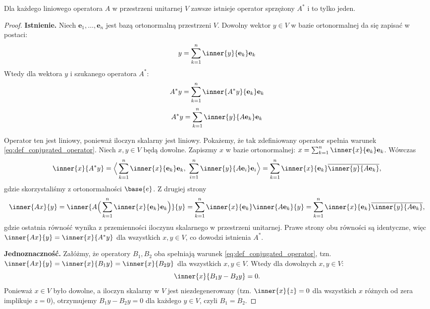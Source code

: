 \begin{theorem}
Dla każdego liniowego operatora $A$ w przestrzeni unitarnej $V$ zawsze istnieje operator sprzężony $A^*$ i to tylko jeden.
\end{theorem}
\begin{proof}
\textbf{Istnienie.} Niech $\mathbf{e}_1, \ldots, \mathbf{e}_n$ jest bazą ortonormalną przestrzeni $V$. Dowolny wektor $y \in V$ w bazie ortonormalnej da się zapisać w postaci:
$$ y = \sum_{k=1}^{n}{\inner{y}{\mathbf{e}_k}\mathbf{e}_k} $$
    Wtedy dla wektora $y$ i szukanego operatora $A^*$:
\begin{equation}
        A^*y = \sum_{k=1}^{n}{\inner{A^*y}{\mathbf{e}_k}\mathbf{e}_k}
\end{equation}
\begin{equation}
        A^*y = \sum_{k=1}^{n}{\inner{y}{A\mathbf{e}_k}\mathbf{e}_k}
\end{equation}

Operator ten jest liniowy, ponieważ iloczyn skalarny jest liniowy.
Pokażemy, że tak zdefiniowany operator spełnia warunek \eqref{eq:def_conjugated_operator}. Niech $x, y \in V$ będą dowolne. Zapiszmy $x$ w bazie ortonormalnej: $x = \sum_{k=1}^n \inner{x}{\mathbf{e}_k}\mathbf{e}_k$. Wówczas
\begin{equation}
    \inner{x}{A^*y} = \Big\langle \sum_{k=1}^n \inner{x}{\mathbf{e}_k}\mathbf{e}_k,\ \sum_{i=1}^n \inner{y}{A\mathbf{e}_i}\mathbf{e}_i \Big\rangle = \sum_{k=1}^n \inner{x}{\mathbf{e}_k}\overline{\inner{y}{A\mathbf{e}_k}},
\end{equation}
gdzie skorzystaliśmy z ortonormalności $\base{e}$. 
Z drugiej strony
\begin{equation}
    \inner{Ax}{y} = \inner{
        A\Big(\sum_{k=1}^n \inner{x}{\mathbf{e}_k}\mathbf{e}_k\Big)
    }{y} = \sum_{k=1}^n \inner{x}{\mathbf{e}_k}\inner{A\mathbf{e}_k}{y} = \sum_{k=1}^n \inner{x}{\mathbf{e}_k}\overline{\inner{y}{A\mathbf{e}_k}},
\end{equation}
gdzie ostatnia równość wynika z przemienności iloczynu skalarnego w przestrzeni unitarnej. 
Prawe strony obu równości są identyczne, więc $\inner{Ax}{y} = \inner{x}{A^*y}$ dla wszystkich $x,y \in V$, co dowodzi istnienia $A^*$.

\textbf{Jednoznaczność.} Załóżmy, że operatory $B_1, B_2$ oba spełniają warunek \eqref{eq:def_conjugated_operator}, tzn. $\inner{Ax}{y} = \inner{x}{B_1y} = \inner{x}{B_2y}$ dla wszystkich $x,y \in V$. Wtedy dla dowolnych $x, y \in V$:
\begin{equation}
    \inner{x}{B_1y - B_2y} = 0.
\end{equation}
Ponieważ $x \in V$ było dowolne, a iloczyn skalarny w $V$ jest niezdegenerowany (tzn. $\inner{x}{z}=0$ dla wszystkich $x$ różnych od zera implikuje $z=0$), otrzymujemy $B_1y - B_2y = 0$ dla każdego $y \in V$, czyli $B_1 = B_2$.
\end{proof}

